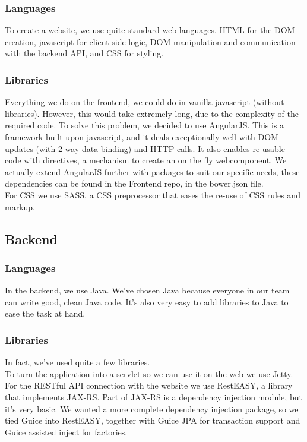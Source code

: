 \subsubsection{Languages}
To create a website, we use quite standard web languages.
HTML for the DOM creation, javascript for client-side logic, DOM manipulation and communication with the backend API, and CSS for styling.

\subsubsection{Libraries}
Everything we do on the frontend, we could do in vanilla javascript (without libraries).
However, this would take extremely long, due to the complexity of the required code.
To solve this problem, we decided to use AngularJS.
This is a framework built upon javascript, and it deals exceptionally well with DOM updates (with 2-way data binding) and HTTP calls.
It also enables re-usable code with directives, a mechanism to create an on the fly webcomponent.
We actually extend AngularJS further with packages to suit our specific needs, these dependencies can be found in the Frontend repo, in the bower.json file.\\

For CSS we use SASS, a CSS preprocessor that eases the re-use of CSS rules and markup.

\subsection{Backend}

\subsubsection{Languages}
In the backend, we use Java.
We've chosen Java because everyone in our team can write good, clean Java code.
It's also very easy to add libraries to Java to ease the task at hand. 

\subsubsection{Libraries}
In fact, we've used quite a few libraries.\\
To turn the application into a servlet so we can use it on the web we use Jetty.
For the RESTful API connection with the website we use RestEASY, a library that implements JAX-RS.
Part of JAX-RS is a dependency injection module, but it's very basic.
We wanted a more complete dependency injection package, so we tied Guice into RestEASY, together with Guice JPA for transaction support and Guice assisted inject for factories.

